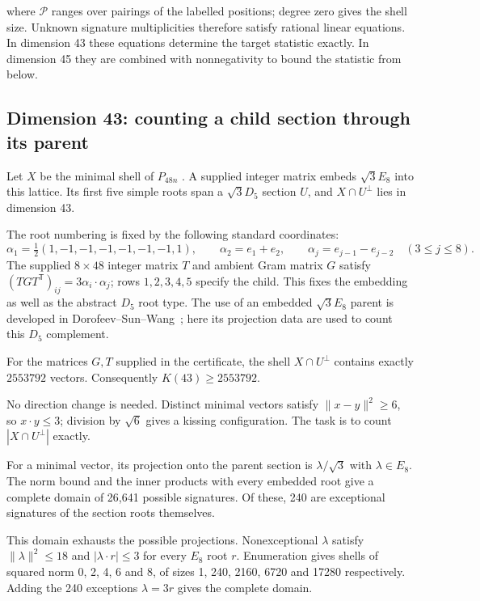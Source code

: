 where \(\mathcal P\) ranges over pairings of the labelled positions;
degree zero gives the shell size. Unknown signature multiplicities
therefore satisfy rational linear equations. In dimension 43 these
equations determine the target statistic exactly. In dimension 45 they
are combined with nonnegativity to bound the statistic from below.

\subsection{Dimension 43: counting a child section through its parent}

Let \(X\) be the minimal shell of \(P_{48n}\) \cite{latticecatalogue}. A supplied integer matrix
embeds \(\sqrt3E_8\) into this lattice. Its first five simple roots span
a \(\sqrt3D_5\) section \(U\), and \(X\cap U^\perp\) lies in dimension
43.

The root numbering is fixed by the following standard coordinates:
\[
\alpha_1=\tfrac12(1,-1,-1,-1,-1,-1,-1,1),\qquad
\alpha_2=e_1+e_2,\qquad
\alpha_j=e_{j-1}-e_{j-2}\quad(3\le j\le8).
\]
The supplied $8\times48$ integer matrix $T$ and ambient Gram matrix $G$
satisfy $(TGT^{\mathsf T})_{ij}=3\alpha_i\cdot\alpha_j$; rows
$1,2,3,4,5$ specify the child. This fixes the embedding as well as the
abstract $D_5$ root type. The use of an embedded $\sqrt3E_8$ parent is
developed in Dorofeev--Sun--Wang~\cite{dorofeev}; here its projection
data are used to count this $D_5$ complement.

\begin{proposition}
\label{prop:section43}
For the matrices $G,T$ supplied in the certificate, the shell
$X\cap U^\perp$ contains exactly $2553792$ vectors. Consequently
$K(43)\ge2553792$.
\end{proposition}

No direction change is needed. Distinct minimal vectors satisfy
$\|x-y\|^2\ge6$, so $x\cdot y\le3$; division by $\sqrt6$ gives a kissing
configuration. The task is to count $|X\cap U^\perp|$ exactly.

For a minimal vector, its projection onto the parent section is
\(\lambda/\sqrt3\) with \(\lambda\in E_8\). The norm bound and the inner
products with every embedded root give a complete domain of 26,641
possible signatures. Of these, 240 are exceptional signatures of the
section roots themselves.

This domain exhausts the possible projections. Nonexceptional $\lambda$
satisfy $\|\lambda\|^2\le18$ and $|\lambda\cdot r|\le3$ for every $E_8$
root $r$. Enumeration gives shells of squared norm 0, 2, 4, 6 and 8,
of sizes 1, 240, 2160, 6720 and 17280 respectively. Adding the 240
exceptions $\lambda=3r$ gives the complete domain.

